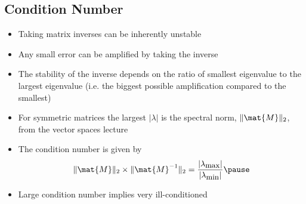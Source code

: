 
\begin{slide}
\section[-2]{Condition Number}

\begin{PauseHighLight}
  \begin{itemize}\squeeze
  \item Taking matrix inverses can be inherently unstable\pause
  \item Any small error can be amplified by taking the inverse\pause
  \item The stability of the inverse depends on the ratio of smallest
    eigenvalue to the largest eigenvalue (i.e. the biggest possible
    amplification compared to the smallest)\pause
  \item For symmetric matrices the largest $|\lambda|$ is the spectral
    norm, $\|\mat{M}\|_2$, from the vector spaces lecture\pause
  \item The condition number is given by
    \begin{align*}
      \|\mat{M}\|_2 \times \|\mat{M}^{-1}\|_2 =
      \frac{|\lambda_{\text{\small max}}|}{|\lambda_{\text{\small min}}|}\pause
    \end{align*}
  \item Large condition number implies very ill-conditioned\pause
  \end{itemize}
\end{PauseHighLight}

\end{slide}

\Outline %

